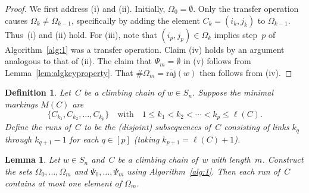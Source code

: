 \documentclass[10pt,a4paper]{amsart}
\newcommand{\absoverrajcode}[1]{\overline{\mathrm{raj}}(#1)}
\newtheorem{lemma}[theorem]{Lemma}
\newtheorem{definition}[theorem]{Definition}
\begin{document}
\begin{proof}
	We first address (i) and (ii). Initially, $\Omega_0=\emptyset$. Only the transfer operation causes $\Omega_k\neq \Omega_{k-1}$, specifically by adding the element $C_k=(i_k,j_k)$ to $\Omega_{k-1}$. Thus~(i) and (ii) hold. For (iii), note that $(i_p,j_p)\in \Omega_k$ implies step~$p$ of Algorithm~\ref{alg:1} was a transfer operation. Claim (iv) holds by an argument analogous to that of (ii). The claim that $\Psi_m=\emptyset$ in (v) follows from Lemma~\ref{lem:algkeyproperty}. That $\#\Omega_m=\absoverrajcode{w}$ then follows from (iv).
\end{proof}

\setcounter{section}{8}\setcounter{theorem}{5}
\begin{definition}
	Let~$C$ be a climbing chain of $w\in S_n$. Suppose the minimal markings $M(C)$ are 
	\[\{C_{k_1},C_{k_2},\ldots,C_{k_p}\}\quad \mbox{with}\quad 1\leq k_1<k_2<\cdots<k_p\leq \ell(C).\]
	Define the \emph{runs} of~$C$ to be the (disjoint) subsequences of~$C$ consisting of links $k_q$ through $k_{q+1}-1$ for each $q\in [p]$ (taking $k_{p+1}=\ell(C)+1$).
\end{definition}

\setcounter{section}{8}\setcounter{theorem}{7}
\begin{lemma}
	\label{lem:atmostoneperrun}
	Let $w\in S_n$ and~$C$ be a climbing chain of~$w$ with length~$m$. Construct the sets $\Omega_0,\ldots,\Omega_m$ and $\Psi_0,\ldots,\Psi_m$ using Algorithm~\ref{alg:1}. Then each run of~$C$ contains at most one element of $\Omega_m$.
\end{lemma}
\end{document}
